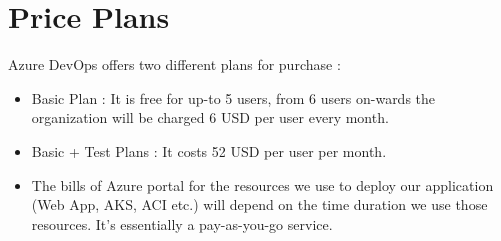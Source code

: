 \documentclass{article}
\begin{document}
\section{Price Plans}

   Azure DevOps offers two different plans for purchase :
   \begin{itemize}
     \item Basic Plan : It is free for up-to 5 users, from 6 users on-wards the organization will be charged 6 USD per user every month.
     \item Basic + Test Plans : It costs 52 USD per user per month. 
    \item The bills of Azure portal for the resources we use to deploy our application (Web App, AKS, ACI etc.) will depend on the time duration we use those resources. It’s essentially a pay-as-you-go service.
   \end{itemize}
\end{document}
